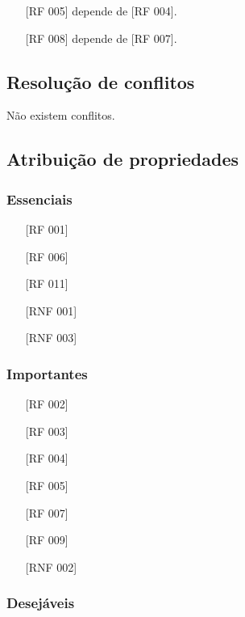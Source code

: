 \documentclass[ppginf, pep]{esinucpel}
\begin{document}
\begin{itemize}
\item[\textbullet] [RF 005] depende de [RF 004].
\item[\textbullet] [RF 008] depende de [RF 007].
\end{itemize}

\subsection{Resolução de conflitos}

Não existem conflitos.

\subsection{Atribuição de propriedades}

\subsubsection{Essenciais}

\begin{itemize}
\item[\textbullet] [RF 001]
\item[\textbullet] [RF 006]
\item[\textbullet] [RF 011]
\item[\textbullet] [RNF 001]
\item[\textbullet] [RNF 003]
\end{itemize}

\subsubsection{Importantes}

\begin{itemize}
\item[\textbullet] [RF 002]
\item[\textbullet] [RF 003]
\item[\textbullet] [RF 004]
\item[\textbullet] [RF 005]
\item[\textbullet] [RF 007]
\item[\textbullet] [RF 009]
\item[\textbullet] [RNF 002]
\end{itemize}

\subsubsection{Desejáveis}
\end{document}
